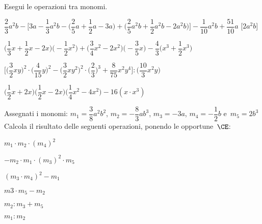 \begin{esercizio}[\Ast]
 \label{ese:9.36}
Esegui le operazioni tra monomi.

\begin{enumeratea}
 \item 
$\dfrac{2}{3}a^{2}b-\bigg[3a-\dfrac{1}{3}a^{2}b-\bigg(\dfrac{2}{5}a+\dfrac{1}{2}
a-3a\bigg)+\bigg(\dfrac{2}{5}a^{2}b+\dfrac{1}{2}a^{2}b-2a^{2}b\bigg)\bigg]%
 -\dfrac{1}{10}a^{2}b+\dfrac{51}{10}a$
  \hfill[$2a^{2}b$]
 \item 
$\bigg(\dfrac{1}{3}x+\dfrac{1}{2}x-2x\bigg)\bigg(-{\dfrac{1}{2}x^{2}}
\bigg)+\bigg(\dfrac{3}{4}x^{2}-2x^{2}\bigg)\bigg(-{\dfrac{3}{5}x}\bigg)%
 -\dfrac{4}{3}\bigg(x^{3}+\dfrac{1}{2}x^{3}\bigg)$
  \hfill{}%
%  
 \item 
$\bigg[\bigg(\dfrac{3}{2}xy\bigg)^{2}\cdot(\dfrac{4}{15}y\bigg)^{2}-\bigg(\dfrac
{3}{2}xy^{2}\bigg)^{2}\cdot\bigg(\dfrac{2}{3}\bigg)^{3}%
 +\dfrac{8}{75}x^{2}y^{4}\bigg]:\bigg(\dfrac{10}{3}x^{2}y\bigg)$
  \hfill{}
 \item 
$\bigg(\dfrac{1}{2}x+2x\bigg)\bigg(\dfrac{1}{2}x-2x\bigg)\bigg(\dfrac{1}{4}x^{2}
-4x^{2}\bigg)-16\left(x \cdot x^{3}\right)$
  \hfill{}
\end{enumeratea}
\end{esercizio}


\begin{esercizio}
 \label{ese:9.37}
Assegnati i monomi:
$m_{1}=\dfrac{3}{8}a^{2}b^{2}$, $m_{2}=-{\dfrac{8}{3}}ab^{3}$, $m_{3}=-3a$, 
$m_{4}=-{\dfrac{1}{2}}b$ e~$m_{5}=2b^{3}$
Calcola il risultato delle seguenti operazioni, ponendo le opportune~$\CE$:
\begin{multicols}{3}
\begin{enumeratea}
 \item $m_{1}\cdot m_{2}\cdot (m_{4})^{2}$
 \item $-m_{2}\cdot m_{1}\cdot (m_{3})^{2}\cdot m_{5}$
 \item $(m_{3}\cdot m_{4})^{2}-m_{1}$
 \item $m3\cdot m_{5}-m_{2}$
 \item $m_{2}:m_{3}+m_{5}$
 \item $m_{1}:m_{2}$
\end{enumeratea}
\end{multicols}
\end{esercizio}


